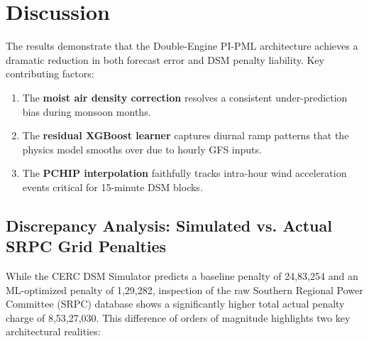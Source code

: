 \documentclass[12pt,a4paper]{report}
\begin{document}
\section{Discussion}

The results demonstrate that the Double-Engine PI-PML architecture achieves a dramatic
reduction in both forecast error and DSM penalty liability. Key contributing factors:

\begin{enumerate}
  \item The \textbf{moist air density correction} resolves a consistent under-prediction
        bias during monsoon months.
  \item The \textbf{residual XGBoost learner} captures diurnal ramp patterns that the
        physics model smooths over due to hourly GFS inputs.
  \item The \textbf{PCHIP interpolation} faithfully tracks intra-hour wind acceleration
        events critical for 15-minute DSM blocks.
\end{enumerate}

\subsection{Discrepancy Analysis: Simulated vs. Actual SRPC Grid Penalties}

While the CERC DSM Simulator predicts a baseline penalty of \textnumero{}24,83,254 and an ML-optimized penalty of \textnumero{}1,29,282, inspection of the raw Southern Regional Power Committee (SRPC) database shows a significantly higher total actual penalty charge of \textnumero{}8,53,27,030. This difference of orders of magnitude highlights two key architectural realities:
\end{document}
